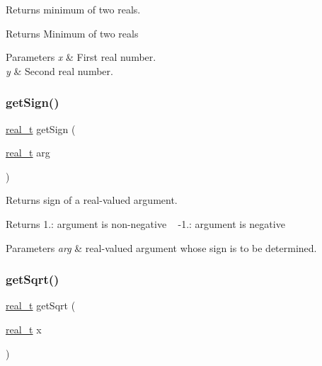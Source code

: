 Returns minimum of two reals. \begin{DoxyReturn}{Returns}
Minimum of two reals 
\end{DoxyReturn}

\begin{DoxyParams}{Parameters}
{\em x} & First real number. \\
\hline
{\em y} & Second real number. \\
\hline
\end{DoxyParams}
\mbox{\label{_utils_8ipp_a7f9147d98ff31048a09a5e61ecd81d2b}} 
\subsubsection{\texorpdfstring{get\+Sign()}{getSign()}}
{\footnotesize\ttfamily \hyperlink{qp_o_a_s_e_s__wrapper_8h_a0d00e2b3dfadee81331bbb39068570c4}{real\+\_\+t} get\+Sign (\begin{DoxyParamCaption}\item[{\hyperlink{qp_o_a_s_e_s__wrapper_8h_a0d00e2b3dfadee81331bbb39068570c4}{real\+\_\+t}}]{arg }\end{DoxyParamCaption})\hspace{0.3cm}{\ttfamily [inline]}}

Returns sign of a real-\/valued argument. \begin{DoxyReturn}{Returns}
1.\+: argument is non-\/negative ~\newline
 -\/1.\+: argument is negative 
\end{DoxyReturn}

\begin{DoxyParams}{Parameters}
{\em arg} & real-\/valued argument whose sign is to be determined. \\
\hline
\end{DoxyParams}
\mbox{\label{_utils_8ipp_a2df4bdf8a7b2e67e604756990028a862}} 
\subsubsection{\texorpdfstring{get\+Sqrt()}{getSqrt()}}
{\footnotesize\ttfamily \hyperlink{qp_o_a_s_e_s__wrapper_8h_a0d00e2b3dfadee81331bbb39068570c4}{real\+\_\+t} get\+Sqrt (\begin{DoxyParamCaption}\item[{\hyperlink{qp_o_a_s_e_s__wrapper_8h_a0d00e2b3dfadee81331bbb39068570c4}{real\+\_\+t}}]{x }\end{DoxyParamCaption})\hspace{0.3cm}{\ttfamily [inline]}}


